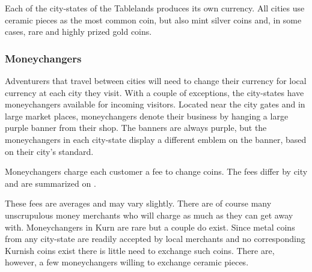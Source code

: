 Each of the city-states of the Tablelands produces its own currency. All cities use ceramic pieces as the most common coin, but also mint silver coins and, in some cases, rare and highly prized gold coins.


\subsubsection{Moneychangers}
Adventurers that travel between cities will need to change their currency for local currency at each city they visit. With a couple of exceptions, the city-states have moneychangers available for incoming visitors. Located near the city gates and in large market places, moneychangers denote their business by hanging a large purple banner from their shop. The banners are always purple, but the moneychangers in each city-state display a different emblem on the banner, based on their city's standard.

Moneychangers charge each customer a fee to change coins. The fees differ by city and are summarized on .


These fees are averages and may vary slightly. There are of course many unscrupulous money merchants who will charge as much as they can get away with. Moneychangers in Kurn are rare but a couple do exist. Since metal coins from any city-state are readily accepted by local merchants and no corresponding Kurnish coins exist there is little need to exchange such coins. There are, however, a few moneychangers willing to exchange ceramic pieces.

